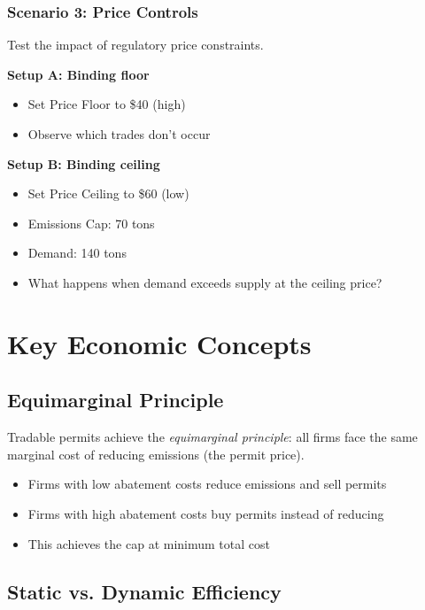 \documentclass{tufte-handout}\usepackage[]{graphicx}\usepackage[]{xcolor}
\begin{document}
\subsubsection{Scenario 3: Price Controls}

Test the impact of regulatory price constraints.

\textbf{Setup A: Binding floor}
\begin{itemize}
\item Set Price Floor to \$40 (high)
\item Observe which trades don't occur
\end{itemize}

\textbf{Setup B: Binding ceiling}
\begin{itemize}
\item Set Price Ceiling to \$60 (low)
\item Emissions Cap: 70 tons
\item Demand: 140 tons
\item What happens when demand exceeds supply at the ceiling price?
\end{itemize}

\section{Key Economic Concepts}

\subsection{Equimarginal Principle}

Tradable permits achieve the \textit{equimarginal principle}: all firms face the same marginal cost of reducing emissions (the permit price).

\begin{itemize}
\item Firms with low abatement costs reduce emissions and sell permits
\item Firms with high abatement costs buy permits instead of reducing
\item This achieves the cap at minimum total cost
\end{itemize}

\subsection{Static vs. Dynamic Efficiency}
\end{document}
